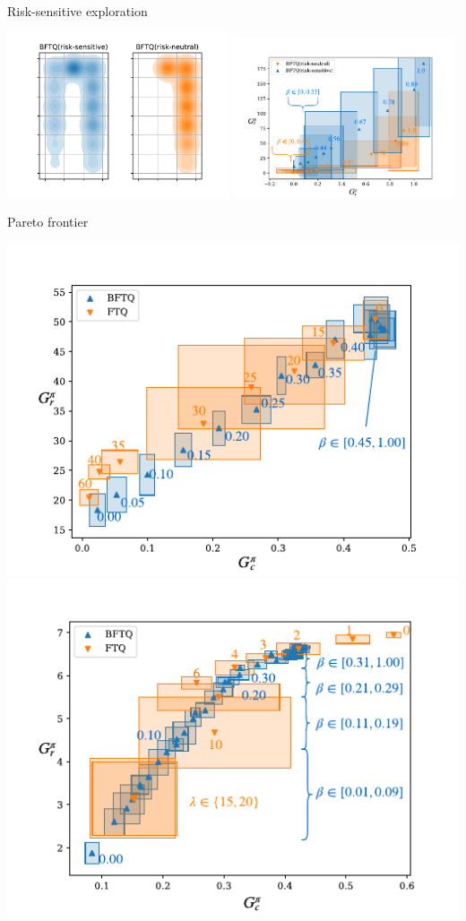 \documentclass[paperwidth=36in,paperheight=48in,portrait,fontscale=0.355, margin=2cm]{baposter}
\begin{document}
\begin{poster}
{\begin{minipage}{0.49\textwidth}
\centering
Risk-sensitive exploration

\includegraphics[width=0.49\textwidth]{../source/img/corridors_densities.pdf}
\includegraphics[page=1, width=0.49\textwidth]{../source/img/corridors}
\end{minipage}
\begin{minipage}{0.5\textwidth}
\centering
Pareto frontier

\includegraphics[width=0.49\linewidth]{../source/img/slot-filling}
\includegraphics[width=0.49\linewidth]{../source/img/highway}
\end{minipage}
}




\end{poster}
\end{document}
